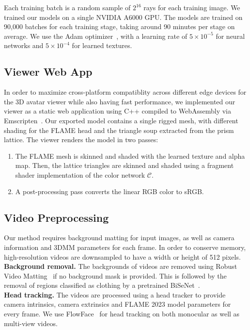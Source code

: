Each training batch is a random sample of $2^{16}$ rays for each training image. We trained our models on a single NVIDIA A6000 GPU. The models are trained on 90,000 batches for each training stage, taking around 90 minutes per stage on average. We use the Adam optimizer~\cite{kingma2015adam}, with a learning rate of $5\times 10^{-5}$ for neural networks and $5\times 10^{-4}$ for learned textures.

\subsection{Viewer Web App}
In order to maximize cross-platform compatiblity across different edge devices for the 3D avatar viewer while also having fast performance, we implemented our viewer as a static web application using C++ compiled to WebAssembly via Emscripten~\cite{emscripten}. Our exported model contains a single rigged mesh, with different shading for the FLAME head and the triangle soup extracted from the prism lattice. The viewer renders the model in two passes:
\begin{enumerate}
    \item The FLAME mesh is skinned and shaded with the learned texture and alpha map. Then, the lattice triangles are skinned and shaded using a fragment shader implementation of the color network $\mathcal{C}$.
    \item A post-processing pass converts the linear RGB color to sRGB.
\end{enumerate}


\subsection{Video Preprocessing}
Our method requires background matting for input images, as well as camera information and 3DMM parameters for each frame. In order to conserve memory, high-resolution videos are downsampled to have a width or height of 512 pixels. \\
\textbf{Background removal.} The backgrounds of videos are removed using Robust Video Matting~\cite{lin2022robust} if no background mask is provided. This is followed by the removal of regions classified as clothing by a pretrained BiSeNet~\cite{yu2018bisenet}. \\
\textbf{Head tracking.} The videos are processed using a head tracker to provide camera intrinsics, camera extrinsics and FLAME 2023 model parameters for every frame. We use FlowFace~\cite{flowface} for head tracking on both monocular as well as multi-view videos.